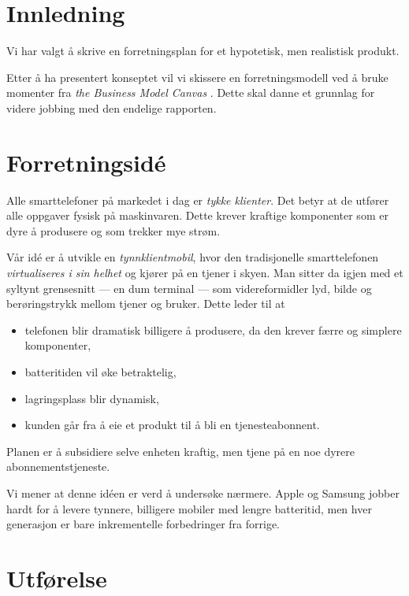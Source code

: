 \section{Innledning}

Vi har valgt å skrive en forretningsplan for et hypotetisk, men realistisk
produkt.

Etter å ha presentert konseptet vil vi skissere en forretningsmodell ved å
bruke momenter fra \textit{the Business Model Canvas} \cite{osterwalder}. Dette
skal danne et grunnlag for videre jobbing med den endelige rapporten.

\section{Forretningsidé}

Alle smarttelefoner på markedet i dag er \textit{tykke klienter}. Det betyr at
de utfører alle oppgaver fysisk på maskinvaren. Dette krever kraftige
komponenter som er dyre å produsere og som trekker mye strøm.

Vår idé er å utvikle en \textit{tynnklientmobil}, hvor den tradisjonelle
smarttelefonen \textit{virtualiseres i sin helhet} og kjører på en tjener i
skyen. Man sitter da igjen med et syltynt grensesnitt --- en dum terminal ---
som videreformidler lyd, bilde og berøringstrykk mellom tjener og bruker. Dette
leder til at

\begin{itemize}
  \item telefonen blir dramatisk billigere å produsere, da den krever færre og
    simplere komponenter,
  \item batteritiden vil øke betraktelig,
  \item lagringsplass blir dynamisk,
  \item kunden går fra å eie et produkt til å bli en tjenesteabonnent.
\end{itemize}

Planen er å subsidiere selve enheten kraftig, men tjene på en noe dyrere
abonnementstjeneste.

Vi mener at denne idéen er verd å undersøke nærmere. Apple og Samsung jobber
hardt for å levere tynnere, billigere mobiler med lengre batteritid, men hver
generasjon er bare inkrementelle forbedringer fra forrige.

\section{Utførelse}


